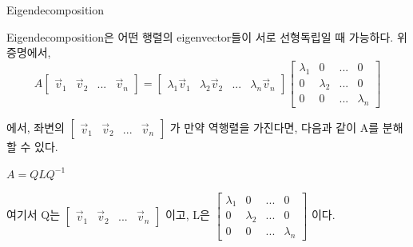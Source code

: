 \documentclass{beamer}
\begin{document}
\begin{frame}{Eigendecomposition} 

Eigendecomposition은 어떤 행렬의 eigenvector들이 서로 선형독립일 때 가능하다. 위 증명에서, 
\begin{equation}
A \left[ \begin{matrix} 
\vec{v}_1 & \vec{v}_2 & ... & \vec{v}_n
\end{matrix} \right] 
= \left[ \begin{matrix} 
\lambda_1 \vec{v}_1 & \lambda_2 \vec{v}_2 & ... & \lambda_n \vec{v}_n
\end{matrix} \right] 
\left[ \begin{matrix} 
\lambda_1 & 0 & ... & 0 \\
0 & \lambda_2 & ... & 0 \\
0 & 0 & ... & \lambda_n \end{matrix} \right]
\end{equation}

에서, 좌변의 $\left[ \begin{matrix} 
\vec{v}_1 & \vec{v}_2 & ... & \vec{v}_n
\end{matrix} \right] $ 가 만약 역행렬을 가진다면, 다음과 같이 A를 분해할 수 있다. 

$ A = QL Q^{-1}$ 

여기서 Q는 $\left[ \begin{matrix} 
\vec{v}_1 & \vec{v}_2 & ... & \vec{v}_n
\end{matrix} \right] $ 이고, L은 $\left[ \begin{matrix} 
\lambda_1 & 0 & ... & 0 \\
0 & \lambda_2 & ... & 0 \\
0 & 0 & ... & \lambda_n \end{matrix} \right]$ 이다. 
\end{frame}







\end{document}
